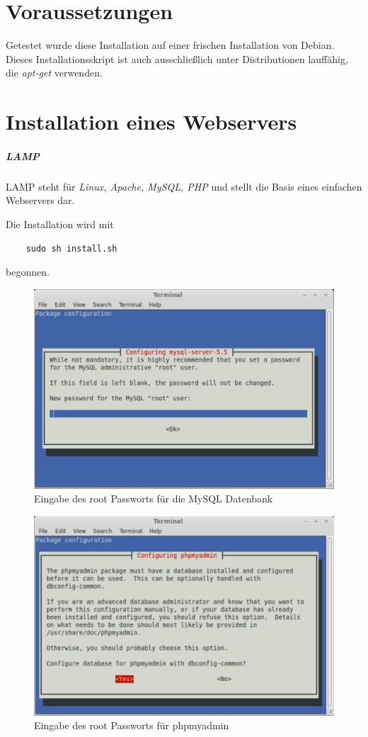 \chapter{Voraussetzungen}
Getestet wurde diese Installation auf einer frischen Installation von Debian. Dieses Installationsskript ist auch ausschließlich unter Distributionen lauffähig, die \emph{apt-get} verwenden.

\chapter{Installation eines Webservers}
\paragraph{LAMP}
LAMP steht für \emph{Linux, Apache, MySQL, PHP} und stellt die Basis eines einfachen Webservers dar.\par

Die Installation wird mit 

\begin{lstlisting}
	sudo sh install.sh
\end{lstlisting}

begonnen.

\begin{figure}[!ht]
	\centering
	\includegraphics[width=15cm]{fig/configuring_mysql}
	\caption{Eingabe des root Passworts für die MySQL Datenbank}
\end{figure}

\begin{figure}[!ht]
	\centering
	\includegraphics[width=15cm]{fig/configure_phpmyadmin}
	\caption{Eingabe des root Passworts für phpmyadmin}
\end{figure}

